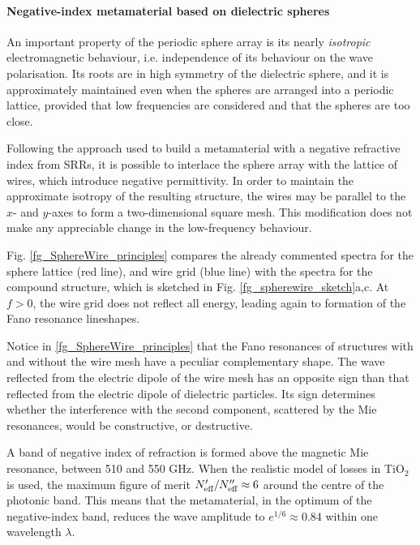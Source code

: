 \paragraph{Negative-index metamaterial based on dielectric spheres} %
An important property of the periodic sphere array is its nearly \textit{isotropic} electromagnetic behaviour, i.e. independence of its behaviour on the wave polarisation. Its roots are in high symmetry of the dielectric sphere, and it is approximately maintained even when the spheres are arranged into a periodic lattice, provided that low frequencies are considered and that the spheres are too close. 

Following the approach used to build a metamaterial with a negative refractive index from SRRs, it is possible to interlace the sphere array with the lattice of wires, which introduce negative permittivity. In order to maintain the approximate isotropy of the resulting structure, the wires may be parallel to the $x$- and $y$-axes to form a two-dimensional square mesh. This modification does not make any appreciable change in the low-frequency behaviour. %

Fig. \ref{fg_SphereWire_principles} compares the already commented spectra for the sphere lattice (red line), and wire grid (blue line) with the spectra for the compound structure, which is sketched in Fig. \ref{fg_spherewire_sketch}a,c. At $f>0$, the wire grid does not reflect all energy, leading again to formation of the Fano resonance lineshapes. 

Notice in \ref{fg_SphereWire_principles} that the Fano resonances of structures with and without the wire mesh have a peculiar complementary shape. The wave reflected from the electric dipole of the wire mesh has an opposite sign than that reflected from the electric dipole of dielectric particles. Its sign determines whether the interference with the second component, scattered by the Mie resonances, would be constructive, or destructive. 

A band of negative index of refraction is formed above the magnetic Mie resonance, between 510 and 550 GHz. When the realistic model of losses in TiO$_2$ is used, the maximum figure of merit $N_{\text{eff} }'/N_{\text{eff} }'' \approx 6$ around the centre of the photonic band. This means that the metamaterial, in the optimum of the negative-index band, reduces the wave amplitude to $e^{1/6} \approx 0.84$ within one wavelength $\lambda$. 

